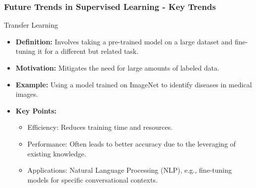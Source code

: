 \documentclass[aspectratio=169]{beamer}
\begin{document}
\begin{frame}[fragile]
    \frametitle{Future Trends in Supervised Learning - Key Trends}
    \begin{block}{Transfer Learning}
        \begin{itemize}
            \item \textbf{Definition:} Involves taking a pre-trained model on a large dataset and fine-tuning it for a different but related task.
            \item \textbf{Motivation:} Mitigates the need for large amounts of labeled data.
            \item \textbf{Example:} Using a model trained on ImageNet to identify diseases in medical images.
        \end{itemize}
        
        \begin{itemize}
            \item \textbf{Key Points:}
                \begin{itemize}
                    \item Efficiency: Reduces training time and resources.
                    \item Performance: Often leads to better accuracy due to the leveraging of existing knowledge.
                    \item Applications: Natural Language Processing (NLP), e.g., fine-tuning models for specific conversational contexts.
                \end{itemize}
        \end{itemize}
    \end{block}
\end{frame}
\end{document}
